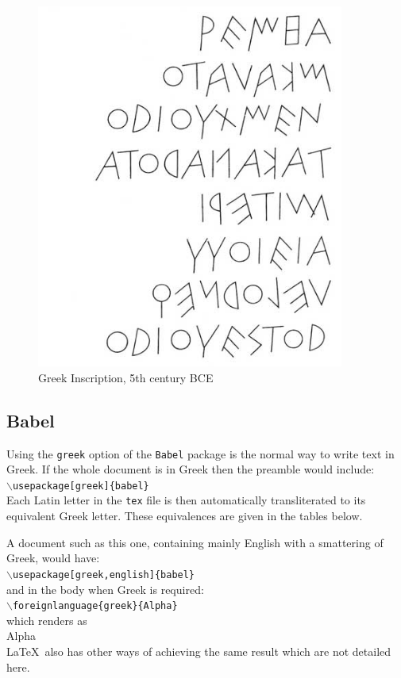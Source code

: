 \begin{figure}[h]
	\centering
		\includegraphics[width=0.9\textwidth]
		            {Greek_Inscription.jpg}
	\caption*{Greek Inscription, 5th century BCE}
	\label{fig:Greek_Inscription}
\end{figure}



\subsection{Babel}
Using the \texttt{greek} option of the \texttt{Babel} package is the normal way to write text in Greek. If the whole document is in Greek then the preamble would include: \\
\indent $\backslash$\texttt{usepackage[greek]\{babel\}} \\
Each Latin letter in the \texttt{tex} file is then automatically transliterated to its equivalent Greek letter. These equivalences are given in the tables below.

A document such as this one, containing mainly English with a smattering of Greek, would have: \\
\indent $\backslash$\texttt{usepackage[greek,english]\{babel\}} \\
and in the body when Greek is required: \\
\indent $\backslash$\texttt{foreignlanguage\{greek\}\{Alpha\}} \\
which renders as \\
\indent \foreignlanguage{greek}{Alpha} \\
\LaTeX\ also has other ways of achieving the same result which are not detailed here.

